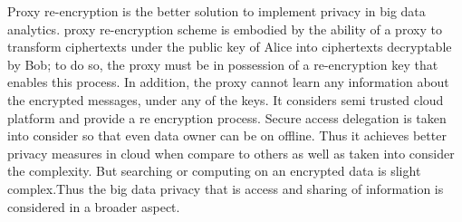 \documentclass[10pt,a4paper,journal]{IEEEtran}
\begin{document}
\hspace{2em}Proxy re-encryption is the better solution to implement privacy in big data analytics. proxy re-encryption scheme is embodied by the ability of a proxy to transform ciphertexts under the public key of Alice into ciphertexts decryptable by Bob; to do so, the proxy must be in possession of a re-encryption key that enables this process. In addition, the proxy cannot learn any information about the encrypted messages, under any of the keys. It considers semi trusted cloud platform and provide a re encryption process. Secure access delegation is taken into consider so that  even data owner can be on offline. Thus it achieves better privacy measures in cloud when compare to others as well as taken into consider the complexity. But searching or computing on an encrypted data is slight complex.Thus the big data privacy that is access and sharing of information is considered in a broader aspect. 
\end{document}
